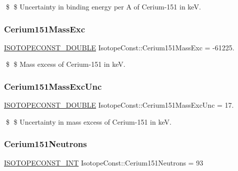 \$ \$ Uncertainty in binding energy per A of Cerium-\/151 in keV. \mbox{\label{group___isotope_const-_cerium-_ce151_ga80df22ad62d90eff279ed38a0029d696}} 
\subsubsection{\texorpdfstring{Cerium151\+Mass\+Exc}{Cerium151MassExc}}
{\footnotesize\ttfamily \mbox{\hyperlink{group___isotope_const-_macros_ga8f45a7272ce02c0b4c65c44636ed719a}{I\+S\+O\+T\+O\+P\+E\+C\+O\+N\+S\+T\+\_\+\+D\+O\+U\+B\+LE}} Isotope\+Const\+::\+Cerium151\+Mass\+Exc = -\/61225.}

\$ \$ Mass excess of Cerium-\/151 in keV. \mbox{\label{group___isotope_const-_cerium-_ce151_gae88866ecca36c041a066a9d800ece4d6}} 
\subsubsection{\texorpdfstring{Cerium151\+Mass\+Exc\+Unc}{Cerium151MassExcUnc}}
{\footnotesize\ttfamily \mbox{\hyperlink{group___isotope_const-_macros_ga8f45a7272ce02c0b4c65c44636ed719a}{I\+S\+O\+T\+O\+P\+E\+C\+O\+N\+S\+T\+\_\+\+D\+O\+U\+B\+LE}} Isotope\+Const\+::\+Cerium151\+Mass\+Exc\+Unc = 17.}

\$ \$ Uncertainty in mass excess of Cerium-\/151 in keV. \mbox{\label{group___isotope_const-_cerium-_ce151_gada3da9d6d4c683351ce2db6f16c9f64b}} 
\subsubsection{\texorpdfstring{Cerium151\+Neutrons}{Cerium151Neutrons}}
{\footnotesize\ttfamily \mbox{\hyperlink{group___isotope_const-_macros_ga5f18360b3e99483a35c32d789e62621c}{I\+S\+O\+T\+O\+P\+E\+C\+O\+N\+S\+T\+\_\+\+I\+NT}} Isotope\+Const\+::\+Cerium151\+Neutrons = 93}

